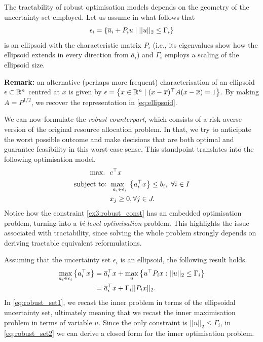 \documentclass{article}
\begin{document}
The tractability of robust optimisation models depends on the geometry of the uncertainty set employed. Let us assume in what follows that 
%
\begin{align}
	\epsilon_i = \left\{ \overline{a}_i + P_iu \mid ||u||_2 \leq \Gamma_i \right \} \label{eq:ellipsoid}
\end{align}
%
is an ellipsoid with the characteristic matrix $P_i$ (i.e., its eigenvalues show how the ellipsoid extends in every direction from $\overline{a}_i$) and $\Gamma_i$ employs a scaling of the ellipsoid size.

{\bf Remark:} an alternative (perhaps more frequent) characterisation of an ellipsoid $\epsilon \subset \mathbb R^n$ centred at $\overline{x}$ is given by $\epsilon = \left\{ x \in \mathbb R^n \mid (x - \overline{x})^\top A(x - \overline{x}) = 1 \right \}$. By making $A = P^{1/2}$, we recover the representation in \eqref{eq:ellipsoid}.

We can now formulate the \emph{robust counterpart}, which consists of a risk-averse version of the original resource allocation problem. In that, we try to anticipate the worst possible outcome and make decisions that are both optimal and guarantee feasibility in this worst-case sense. This standpoint translates into the following optimisation model.
%
\begin{align}
\maxi \ &  c^\top x \nonumber \\
\st & \maxi_{a_{i} \in \epsilon_i}\braces{a_i^\top x} \leq b_i, \ \forall i \in I \label{ex3:robust_const}\\
& x_j \geq 0, \forall j \in J. \nonumber
\end{align}
%
Notice how the constraint \eqref{ex3:robust_const} has an embedded optimisation problem, turning into a \emph{bi-level optimisation} problem. This highlights the issue associated with tractability, since solving the whole problem strongly depends on deriving tractable equivalent reformulations.

Assuming that the uncertainty set $\epsilon_i$ is an ellipsoid, the following result holds.
%
\begin{align}
\max_{a_{i} \in \epsilon_i}\left\{ a_i^\top x \right \}  & = \overline{a}_i^\top x + \max_u\left\{ u^\top P_i x : ||u||_2 \leq \Gamma_i \right \} \label{eq:robust_set1}\\
& = \overline{a}_i^\top x + \Gamma_i||P_i x||_2. \label{eq:robust_set2}
\end{align}
%
In \eqref{eq:robust_set1}, we recast the inner problem in terms of the ellipsoidal uncertainty set, ultimately meaning that we recast the inner maximisation problem in terms of variable $u$. Since the only constraint is $||u||_2 \leq \Gamma_i$, in \eqref{eq:robust_set2} we can derive a closed form for the inner optimisation problem.
\end{document}

